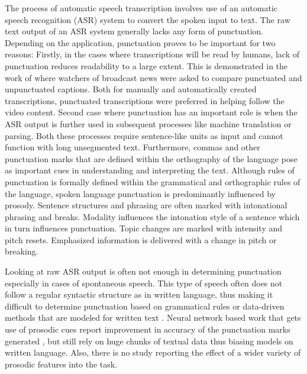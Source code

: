 The process of automatic speech transcription involves use of an automatic speech recognition (ASR) system to convert the spoken input to text. The raw text output of an ASR system generally lacks any form of punctuation. Depending on the application, punctuation proves to be important for two reasons: Firstly, in the cases where transcriptions will be read by humans, lack of punctuation reduces readability to a large extent. This is demonstrated in the work of \cite{Tundik2018} where watchers of broadcast news were asked to compare punctuated and unpunctuated captions. Both for manually and automatically created transcriptions, punctuated transcriptions were preferred in helping follow the video content. Second case where punctuation has an important role is when the ASR output is further used in subsequent processes like machine translation or parsing. Both these processes require sentence-like units as input and cannot function with long unsegmented text. Furthermore, commas and other punctuation marks that are defined within the orthography of the language pose as important cues in understanding and interpreting the text. Although rules of punctuation is formally defined within the grammatical and orthographic rules of the language, spoken language punctuation is predominantly influenced by prosody. Sentence structures and phrasing are often marked with intonational phrasing and breaks. Modality influences the intonation style of a sentence which in turn influences punctuation. Topic changes are marked with intensity and pitch resets. Emphasized information is delivered with a change in pitch or breaking. 

Looking at raw ASR output is often not enough in determining punctuation especially in cases of spontaneous speech. This type of speech often does not follow a regular syntactic structure as in written language, thus making it difficult to determine punctuation based on grammatical rules or data-driven methods that are modeled for written text \citep{ballesterosneural}. Neural network based work that gets use of prosodic cues report improvement in accuracy of the punctuation marks generated \citep{tilk2016bidirectional}, but still rely on huge chunks of textual data thus biasing models on written language. Also, there is no study reporting the effect of a wider variety of prosodic features into the task. 

